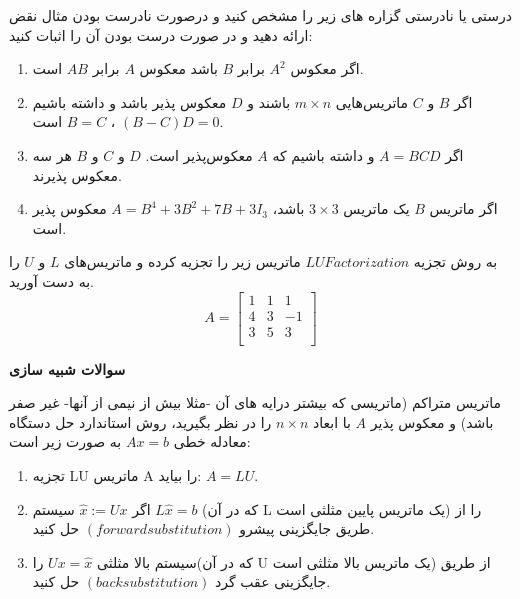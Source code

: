 \documentclass{article}
\begin{document}
درستی یا نادرستی گزاره های زیر را مشخص کنید و درصورت نادرست بودن مثال نقض ارائه دهید و در صورت درست بودن آن را اثبات کنید:
\begin{enumerate}
	\item اگر معکوس $A^2$ برابر $B$  باشد معکوس $A$ برابر $AB$ است.
\\
\item اگر $B$ و $C$ ماتریس‌هایی $m \times n$ باشند و $D$ معکوس پذیر باشد  و داشته باشیم 
$(B - C)D = 0$ ، $B = C$ است.
\\
\item اگر $A = BCD$ و داشته باشیم که $A$ معکوس‌پذیر است. $D$ و $C$ و $B$ هر سه معکوس پذیرند.
\\
\item اگر ماتریس $B$ یک ماتریس $3 \times 3$ باشد، $A = B^4 + 3B^2 + 7B + 3I_{3}$ معکوس پذیر است.

\end{enumerate}


به روش تجزیه $LU Factorization$ ماتریس زیر را تجزیه کرده و
ماتریس‌های $L$ و $U$ را به دست آورید. 
\\
\[A=
\begin{bmatrix}
    1       & 1      & 1 \\
    4       & 3      & -1 \\
    3       & 5      & 3 \\
\end{bmatrix}
\]

	\clearpage
{\LARGE{\textbf{سوالات شبیه سازی}}}


ماتریس متراکم (ماتریسی که بیشتر درایه های آن -مثلا بیش از نیمی از آنها- غیر صفر باشد) و معکوس پذیر
$A$
با ابعاد
$n \times n $
را در نظر بگیرید، روش استاندارد حل دستگاه معادله خطی 
$ Ax = b $
به صورت زیر است:
\begin{enumerate}
	\item 
	تجزیه
LU
	  ماتریس
A
	   را بیاید:
	$ A = LU$.
	
	\item 
	اگر 
	$\hat{x} := Ux$
	سیستم
	$L\hat{x} = b$
	(که در آن L یک ماتریس پایین مثلثی است) را از طریق جایگزینی پیشرو 
 $(forward substitution)$
حل کنید.
\item 
	سیستم بالا مثلثی 
$Ux= \hat{x} $
را(که در آن U یک ماتریس بالا مثلثی است) از طریق جایگزینی عقب گرد 
$(back substitution)$
حل کنید.
\end{enumerate}
\end{document}

